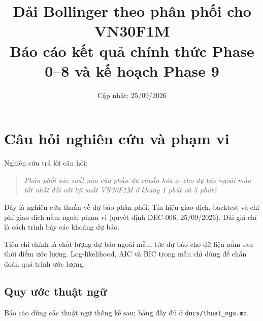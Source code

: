 \documentclass[11pt,a4paper]{article}
\title{\textbf{Dải Bollinger theo phân phối cho VN30F1M}\\[0.3em]
\large Báo cáo kết quả chính thức Phase 0--8 và kế hoạch Phase 9}
\author{}
\date{Cập nhật: 25/09/2026}
\begin{document}
\maketitle
\tableofcontents
\newpage

\section{Câu hỏi nghiên cứu và phạm vi}

Nghiên cứu trả lời câu hỏi:

\begin{quote}
\textit{Phân phối xác suất nào của phần dư chuẩn hóa $z_t$ cho dự báo ngoài mẫu tốt nhất đối với lợi suất VN30F1M ở khung 1 phút và 5 phút?}
\end{quote}

Đây là nghiên cứu thuần về dự báo phân phối. Tín hiệu giao dịch, backtest và chi phí giao dịch nằm ngoài phạm vi (quyết định DEC-006, 25/09/2026). Dải giá chỉ là cách trình bày các khoảng dự báo.

Tiêu chí chính là chất lượng dự báo ngoài mẫu, tức dự báo cho dữ liệu nằm sau thời điểm ước lượng. Log-likelihood, AIC và BIC trong mẫu chỉ dùng để chẩn đoán quá trình ước lượng.

\subsection{Quy ước thuật ngữ}

Báo cáo dùng các thuật ngữ thống kê sau; bảng đầy đủ ở \texttt{docs/thuat\_ngu.md}.
\end{document}
